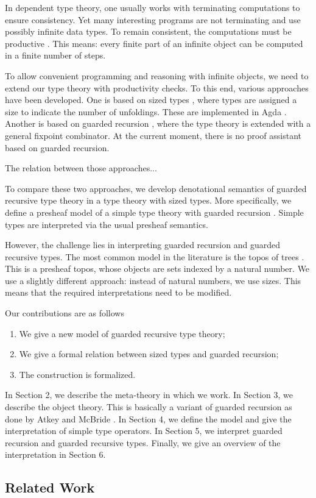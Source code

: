 In dependent type theory, one usually works with terminating computations to ensure consistency.
Yet many interesting programs are not terminating and use possibly infinite data types.
To remain consistent, the computations must be productive \cite{Coquand93}.
This means: every finite part of an infinite object can be computed in a finite number of steps.

To allow convenient programming and reasoning with infinite objects, we need to extend our type theory with productivity checks.
To this end, various approaches have been developed.
One is based on sized types \cite{A-sized,AVW-normalization}, where types are assigned a size to indicate the number of unfoldings.
These are implemented in Agda \cite{norell2008}.
Another is based on guarded recursion \cite{atkey2013productive,BahrGM17}, where the type theory is extended with a general fixpoint combinator.
At the current moment, there is no proof assistant based on guarded recursion.

The relation between those approaches...

To compare these two approaches, we develop denotational semantics of guarded recursive type theory in a type theory with sized types.
More specifically, we define a presheaf model of a simple type theory with guarded recursion \cite{BMSS-synthetic}.
Simple types are interpreted via the usual presheaf semantics.

However, the challenge lies in interpreting guarded recursion and guarded recursive types.
The most common model in the literature is the topos of trees \cite{BMSS-synthetic}.
This is a presheaf topos, whose objects are sets indexed by a natural number.
We use a slightly different approach: instead of natural numbers, we use sizes.
This means that the required interpretations need to be modified.

Our contributions are as follows
\begin{enumerate}
	\item We give a new model of guarded recursive type theory;
	\item We give a formal relation between sized types and guarded recursion;
	\item The construction is formalized.
\end{enumerate}

In Section 2, we describe the meta-theory in which we work.
In Section 3, we describe the object theory.
This is basically a variant of guarded recursion as done by Atkey and McBride \cite{atkey2013productive}.
In Section 4, we define the model and give the interpretation of simple type operators.
In Section 5, we interpret guarded recursion and guarded recursive types.
Finally, we give an overview of the interpretation in Section 6.


\subsection*{Related Work}